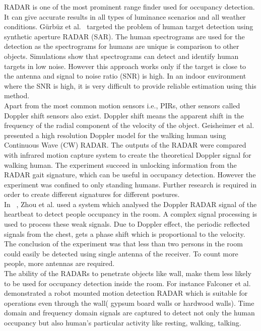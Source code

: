 
RADAR is one of the most prominent range finder used for occupancy detection. It can give accurate results in all types of luminance scenarios and all weather conditions.
G\"{u}rb\"{u}z et al.~\cite{gurbuz2007detection} targeted the problem of human target detection using synthetic aperture RADAR (SAR). The human spectrograms are used for the detection as the spectrograms for humans are unique is comparison to other objects. Simulations show that spectrograms can detect and identify human targets in low noise. However this approach works only if the target is close to the antenna and signal to noise ratio (SNR) is high. In an indoor environment where the SNR is high, it is very difficult to provide reliable estimation using this method.
\\

Apart from the most common motion sensors i.e., PIRs, other sensors called Doppler shift sensors also exist. Doppler shift means the apparent shift in the frequency of the radial component of the velocity of the object.
Geisheimer et al.~\cite{geisheimer2002high} presented a high resolution Doppler model for the walking human using Continuous Wave (CW) RADAR. The outputs of the RADAR were compared with infrared motion capture system to create the theoretical Doppler signal for walking human. The experiment succeed in unlocking information from the RADAR gait signature, which can be useful in occupancy detection. However the experiment was confined to only standing humans. Further research is required in order to create different signatures for different postures. 
\\

In ~\cite{zhou2006detection}, Zhou et al. used a system which analysed the Doppler RADAR signal of the heartbeat to detect people occupancy in the room. A complex signal processing is used to process these weak signals. Due to Doppler effect, the periodic reflected signals from the chest, gets a phase shift which is proportional to the velocity. The conclusion of the experiment was that less than two persons in the room could easily be detected using single antenna of the receiver. To count more people, more antennas are required. 
\\

The ability of the RADARs to penetrate objects like wall, make them less likely to be used for occupancy detection inside the room. For instance Falconer et al.~\cite{falconer2000robot} demonstrated a robot mounted motion detection RADAR which is suitable for operations even through the wall( gypsum board walls or hardwood walls). Time domain and frequency domain signals are captured to detect not only the human occupancy but also human's particular activity like resting, walking, talking.

